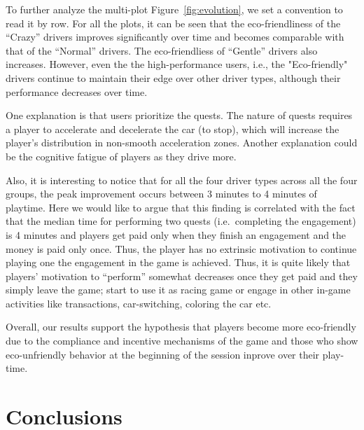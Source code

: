 \documentclass[preprint,authoryear,12pt]{elsarticle}
\begin{document}
To further analyze the multi-plot Figure~\ref{fig:evolution}, we set a convention to read it by row. For all the plots, it can be seen that the eco-friendliness of the ``Crazy'' drivers improves significantly over time and becomes comparable with that of the ``Normal'' drivers. The eco-friendliess of ``Gentle'' drivers also increases. However, even the the high-performance users, i.e., the "Eco-friendly" drivers continue to maintain their edge over other driver types, although their performance decreases over time. 

One explanation is that users prioritize the quests. The nature of quests requires a player to accelerate and decelerate the car (to stop), which will increase the player's distribution in non-smooth acceleration zones. Another explanation could be the cognitive fatigue of players as they drive more. 

Also, it is interesting to notice that for all the four driver types across all the four groups, the peak improvement occurs between 3 minutes to 4 minutes of playtime. Here we would like to argue that this finding is correlated with the fact that the median time for performing two quests (i.e.~completing the engagement) is 4 minutes and players get paid only when they finish an engagement and the money is paid only once. Thus, the player has no extrinsic motivation to continue playing one the engagement in the game is achieved. Thus, it is quite likely that players' motivation to ``perform'' somewhat decreases once they get paid and they simply leave the game; start to use it as racing game or engage in other in-game activities like transactions, car-switching, coloring the car etc. 


Overall, our results support the hypothesis that players become more eco-friendly due to the compliance and incentive mechanisms of the game and those who show eco-unfriendly behavior at the beginning of the session inprove over their play-time. 


\section{Conclusions} \label{sec:conclusions}

\end{document}

